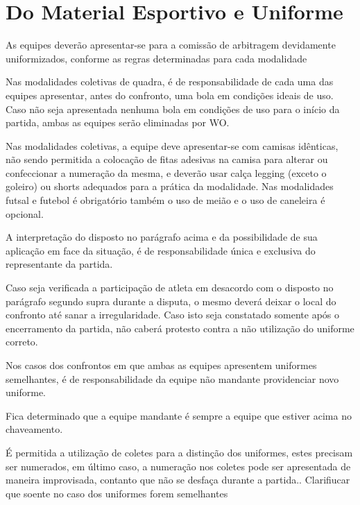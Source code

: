 {\let\clearpage\relax \chapter{Do Material Esportivo e Uniforme %
\label{chp:material}}}


\begin{article}
	As equipes deverão apresentar-se para a comissão de arbitragem devidamente uniformizados, conforme as regras determinadas para cada modalidade

	\begin{xparagraph}
		Nas modalidades coletivas de quadra, é de responsabilidade de cada uma das equipes apresentar, antes do confronto, uma bola em condições ideais de uso. Caso não seja apresentada nenhuma bola em condições de uso para o início da partida, ambas as equipes serão eliminadas por WO.
	\end{xparagraph}

	\begin{xparagraph}
		Nas modalidades coletivas, a equipe deve apresentar-se com camisas idênticas, não sendo permitida a colocação de fitas adesivas na camisa para alterar ou confeccionar a numeração da mesma, e deverão usar calça legging (exceto o goleiro) ou shorts adequados para a prática da modalidade. Nas modalidades futsal e futebol é obrigatório também o uso de meião e o uso de caneleira é opcional.
	\end{xparagraph}

	\begin{xparagraph}
		A interpretação do disposto no parágrafo acima e da possibilidade de sua aplicação em face da situação, é de responsabilidade única e exclusiva do representante da partida.
	\end{xparagraph}

	\begin{xparagraph}
		Caso seja verificada a participação de atleta em desacordo com o disposto no parágrafo segundo supra durante a disputa, o mesmo deverá deixar o local do confronto até sanar a irregularidade. Caso isto seja constatado somente após o encerramento da partida, não caberá protesto contra a não utilização do uniforme correto.
	\end{xparagraph}

	\begin{xparagraph}
		Nos casos dos confrontos em que ambas as equipes apresentem uniformes semelhantes, é de responsabilidade da equipe não mandante providenciar novo uniforme.
	\end{xparagraph}

	\begin{xparagraph}
		Fica determinado que a equipe mandante é sempre a equipe que estiver acima no chaveamento.
	\end{xparagraph}

	\begin{xparagraph}
		É permitida a utilização de coletes para a distinção dos uniformes, estes precisam ser numerados, em último caso, a numeração nos coletes pode ser apresentada de maneira improvisada, contanto que não se desfaça durante a partida..
		Clarifiucar que soente no caso dos uniformes forem semelhantes
	\end{xparagraph}
\end{article}
